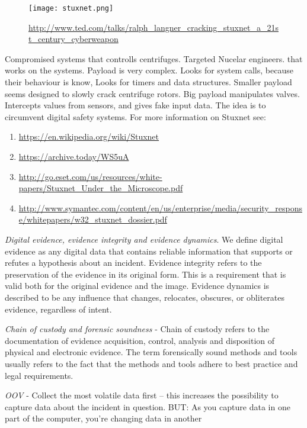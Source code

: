 \begin{figure}[h]
    \centering\texttt{[image: stuxnet.png]}
    \caption{\url{http://www.ted.com/talks/ralph\_langner\_cracking\_stuxnet\_a\_21st\_century\_cyberweapon}}
\end{figure}
Compromised systems that controlls centrifuges. Targeted Nucelar engineers.
that works on the systems. Payload is very complex. Looks for system calls, 
because their behaviour is know, Looks for timers and data structures. Smaller
payload seems designed to slowly crack centrifuge rotors. Big payload 
manipulates valves. Intercepts values from sensors, and gives fake input data. 
The idea is to circumvent digital safety systems. For more information on 
Stuxnet see:\\
\begin{enumerate}
    \item \url{https://en.wikipedia.org/wiki/Stuxnet}
    \item \url{https://archive.today/WS5uA}
    \item \url{http://go.eset.com/us/resources/white-papers/Stuxnet\_Under\_the\_Microscope.pdf}
    \item \url{http://www.symantec.com/content/en/us/enterprise/media/security\_response/whitepapers/w32\_stuxnet\_dossier.pdf}
\end{enumerate}

\textit{Digital evidence, evidence integrity and evidence dynamics}. 
We define digital evidence as any digital data that contains reliable 
information that supports or refutes a hypothesis about an incident.
Evidence integrity refers to the preservation of the evidence in its original 
form. This is a requirement that is valid both for the original evidence and the
image. Evidence dynamics is described to be any influence that changes, 
relocates, obscures, or obliterates evidence, regardless of intent.

\textit{Chain of custody and forensic soundness} - Chain of custody refers to 
the documentation of evidence acquisition, control, analysis and disposition 
of physical and electronic evidence. The term forensically sound methods and 
tools usually refers to the fact that the methods and tools adhere to best 
practice and legal requirements.

\textit{OOV} - Collect the most volatile data first – this increases the 
possibility to capture data about the incident in question. BUT: As you capture 
data in one part of the computer, you’re changing data in another

